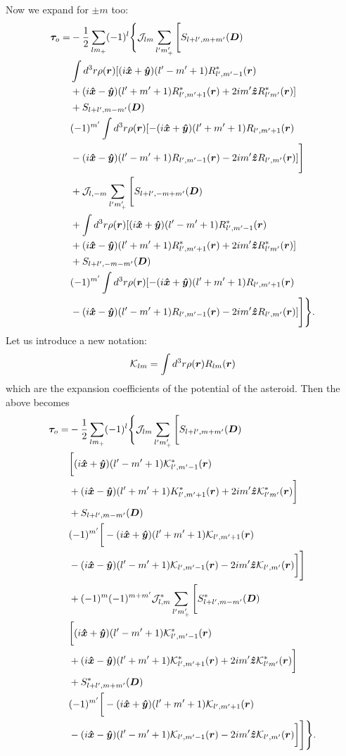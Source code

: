 \documentclass[aps,twocolumn,secnumarabic,balancelastpage,amsmath,amssymb,nofootinbib,floatfix]{revtex4-1}
\begin{document}
Now we expand for $\pm m$ too:
\begin{equation*}
\begin{aligned}
\bm \tau_o = &-\frac{1}{2}\sum_{lm_+}(-1)^l \Bigg\{\mathcal{J}_{lm}\sum_{l'm'_+} \Bigg[S_{l+l',m+m'}(\bm D) \\
&\int d^3 r \rho(\bm r) [(i\bm{\hat x} + \bm{\hat y})(l'-m'+1)R^*_{l',m'-1}(\bm r)\\
&+(i\bm{\hat x}-\bm{\hat y})(l'+m'+1)R^*_{l',m'+1}(\bm r)+2im'\bm{\hat z} R^*_{l'm'}(\bm r)]\\
&+S_{l+l',m-m'}(\bm D) \\
&(-1)^{m'}\int d^3 r \rho(\bm r) [-(i\bm{\hat x} + \bm{\hat y})(l'+m'+1)R_{l',m'+1}(\bm r)\\
&-(i\bm{\hat x}-\bm{\hat y})(l'-m'+1)R_{l',m'-1}(\bm r)-2im'\bm{\hat z} R_{l',m'}(\bm r)]\Bigg]\\
&+ \mathcal{J}_{l,-m}\sum_{l'm'_+} \Bigg[S_{l+l',-m+m'}(\bm D) \\
&+\int d^3 r \rho(\bm r) [(i\bm{\hat x} + \bm{\hat y})(l'-m'+1)R^*_{l',m'-1}(\bm r)\\
&+(i\bm{\hat x}-\bm{\hat y})(l'+m'+1)R^*_{l',m'+1}(\bm r)+2im'\bm{\hat z} R^*_{l'm'}(\bm r)]\\
&+S_{l+l',-m-m'}(\bm D) \\
&(-1)^{m'}\int d^3 r \rho(\bm r) [-(i\bm{\hat x} + \bm{\hat y})(l'+m'+1)R_{l',m'+1}(\bm r)\\
&-(i\bm{\hat x}-\bm{\hat y})(l'-m'+1)R_{l',m'-1}(\bm r)-2im'\bm{\hat z} R_{l',m'}(\bm r)]\Bigg]\Bigg\}.
\end{aligned}
\end{equation*}
Let us introduce a new notation:
\begin{equation}
\mathcal{K}_{lm} = \int d^3 r \rho(\bm r) R_{lm} (\bm r)
\label{eqn:klm-def}
\end{equation}
which are the expansion coefficients of the potential of the asteroid. Then the above becomes
\begin{equation*}
\begin{aligned}
\bm \tau_o = &-\frac{1}{2}\sum_{lm_+}(-1)^l \Bigg\{\mathcal{J}_{lm}\sum_{l'm'_+} \Bigg[S_{l+l',m+m'}(\bm D) \\
&\bigg[(i\bm{\hat x} + \bm{\hat y})(l'-m'+1)\mathcal{K}^*_{l',m'-1}(\bm r)\\
&+(i\bm{\hat x}-\bm{\hat y})(l'+m'+1)K^*_{l',m'+1}(\bm r)+2im'\bm{\hat z} \mathcal{K}^*_{l'm'}(\bm r)\bigg]\\
&+S_{l+l',m-m'}(\bm D) \\
&(-1)^{m'}\bigg[-(i\bm{\hat x} + \bm{\hat y})(l'+m'+1)\mathcal{K}_{l',m'+1}(\bm r)\\
&-(i\bm{\hat x}-\bm{\hat y})(l'-m'+1)\mathcal{K}_{l',m'-1}(\bm r)-2im'\bm{\hat z} \mathcal{K}_{l',m'}(\bm r)\bigg]\Bigg]\\
&+ (-1)^m (-1)^{m+m'}\mathcal{J}_{l,m}^*\sum_{l'm'_+} \Bigg[S^*_{l+l',m-m'}(\bm D) \\
&\bigg[(i\bm{\hat x} + \bm{\hat y})(l'-m'+1)\mathcal{K}^*_{l',m'-1}(\bm r)\\
&+(i\bm{\hat x}-\bm{\hat y})(l'+m'+1)\mathcal{K}^*_{l',m'+1}(\bm r)+2im'\bm{\hat z} \mathcal{K}^*_{l'm'}(\bm r)\bigg]\\
&+S^*_{l+l',m+m'}(\bm D) \\
&(-1)^{m'}\bigg[-(i\bm{\hat x} + \bm{\hat y})(l'+m'+1)\mathcal{K}_{l',m'+1}(\bm r)\\
&-(i\bm{\hat x}-\bm{\hat y})(l'-m'+1)\mathcal{K}_{l',m'-1}(\bm r)-2im'\bm{\hat z} \mathcal{K}_{l',m'}(\bm r)\bigg]\Bigg]\Bigg\}.
\end{aligned}
\end{equation*}
\end{document}
